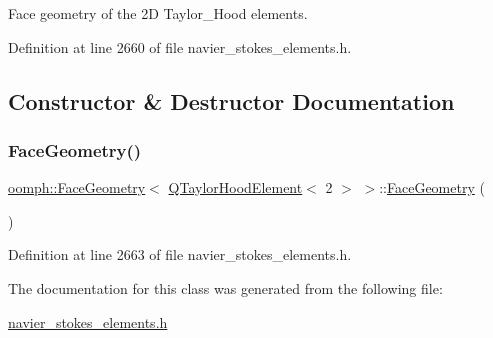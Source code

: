 Face geometry of the 2D Taylor\+\_\+\+Hood elements. 

Definition at line 2660 of file navier\+\_\+stokes\+\_\+elements.\+h.



\subsection{Constructor \& Destructor Documentation}
\mbox{\label{classoomph_1_1FaceGeometry_3_01QTaylorHoodElement_3_012_01_4_01_4_a1e10eeb6bc3011f4af30bfbeae0da456}} 
\subsubsection{\texorpdfstring{Face\+Geometry()}{FaceGeometry()}}
{\footnotesize\ttfamily \hyperlink{classoomph_1_1FaceGeometry}{oomph\+::\+Face\+Geometry}$<$ \hyperlink{classoomph_1_1QTaylorHoodElement}{Q\+Taylor\+Hood\+Element}$<$ 2 $>$ $>$\+::\hyperlink{classoomph_1_1FaceGeometry}{Face\+Geometry} (\begin{DoxyParamCaption}{ }\end{DoxyParamCaption})\hspace{0.3cm}{\ttfamily [inline]}}



Definition at line 2663 of file navier\+\_\+stokes\+\_\+elements.\+h.



The documentation for this class was generated from the following file\+:\begin{DoxyCompactItemize}
\item 
\hyperlink{navier__stokes__elements_8h}{navier\+\_\+stokes\+\_\+elements.\+h}\end{DoxyCompactItemize}
